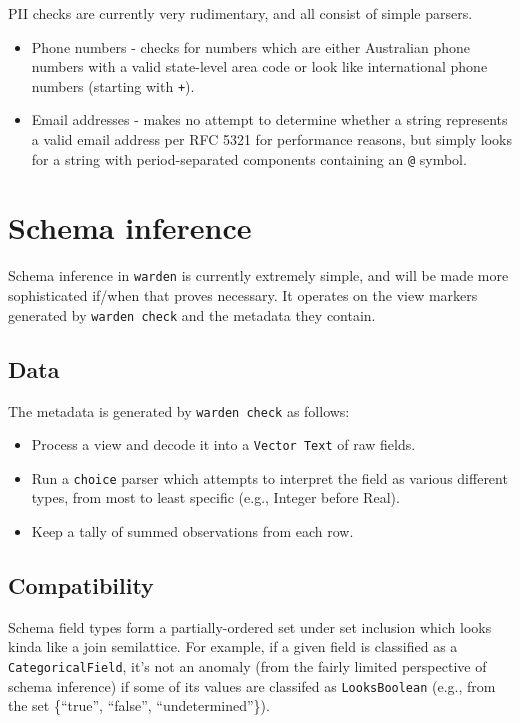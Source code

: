 \documentclass[a4paper]{article}
\begin{document}
PII checks are currently very rudimentary, and all consist of simple
parsers.

\begin{itemize}
  \item Phone numbers - checks for numbers which are either
    Australian phone numbers with a valid state-level area code or
    look like international phone numbers (starting with \texttt{+}).
  \item Email addresses - makes no attempt to determine whether a
    string represents a valid email address per RFC 5321\cite{rfc5321}
    for performance reasons, but simply looks for a string with
    period-separated components containing an \texttt{@} symbol.
\end{itemize}

\section{Schema inference}\label{schema-inference}

Schema inference in \texttt{warden} is currently extremely simple, and will be
made more sophisticated if/when that proves necessary. It operates on
the view markers generated by \texttt{warden\ check} and the metadata
they contain.

\subsection{Data}\label{data}

The metadata is generated by \texttt{warden\ check} as follows:

\begin{itemize}
\item
  Process a view and decode it into a \texttt{Vector\ Text} of raw
  fields.
\item
  Run a \texttt{choice} parser which attempts to interpret the field as
  various different types, from most to least specific (e.g., Integer
  before Real).
\item
  Keep a tally of summed observations from each row.
\end{itemize}

\subsection{Compatibility}\label{compatibility}

Schema field types form a partially-ordered set under set inclusion
which looks kinda like a join semilattice. For example, if a given field
is classified as a \texttt{CategoricalField}, it's not an anomaly (from
the fairly limited perspective of schema inference) if some of its
values are classifed as \texttt{LooksBoolean} (e.g., from the set
\{``true'', ``false'', ``undetermined''\}).
\end{document}
